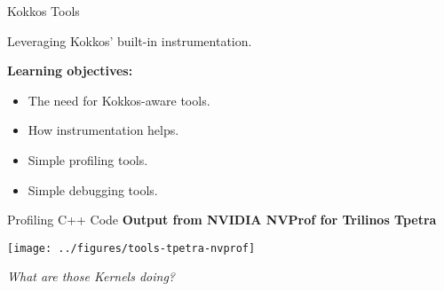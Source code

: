\begin{frame}[fragile]

  {\Huge Kokkos Tools}

  \vspace{10pt}

  {\large Leveraging Kokkos' built-in instrumentation.}

  \vspace{20pt}

  \textbf{Learning objectives:}
  \begin{itemize}
    \item {The need for Kokkos-aware tools.}
    \item {How instrumentation helps.}
    \item {Simple profiling tools.}
    \item {Simple debugging tools.}
  \end{itemize}

  \vspace{-20pt}

\end{frame}


\begin{frame}[fragile]{Profiling C++ Code}
  \textbf{Output from NVIDIA NVProf for Trilinos Tpetra}

  \texttt{[image: ../figures/tools-tpetra-nvprof]}

\vspace{5pt}
\pause
\textit{What are those Kernels doing?}
\end{frame}


